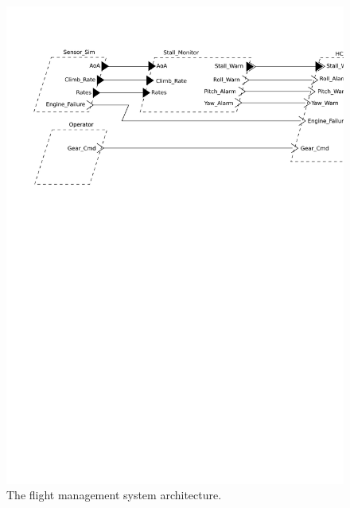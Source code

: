 \begin{figure}
\centering
\includegraphics[scale=0.5]{figs/caseStudy}
\caption{The flight management system architecture.}
\label{fig:case_study}
\end{figure}

